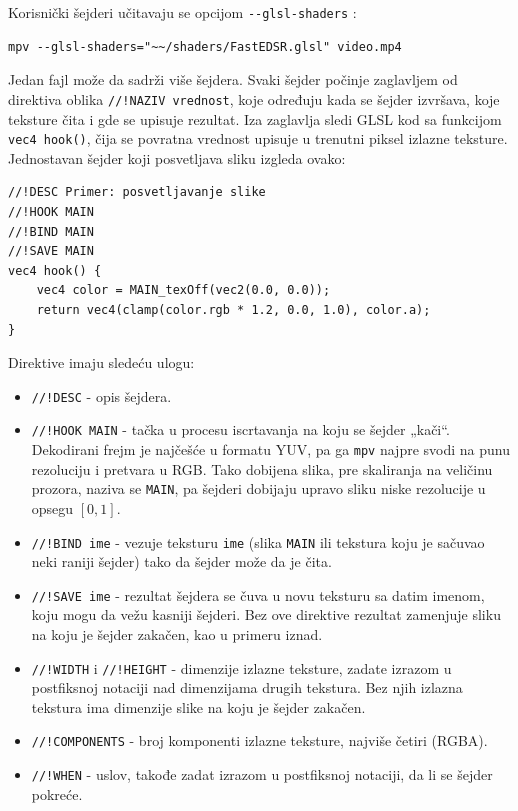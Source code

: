 \documentclass[12pt,a4paper]{article}
\begin{document}
Korisnički šejderi učitavaju se opcijom \texttt{-{}-glsl-shaders} \cite{mpvManual}:
\begin{verbatim}
mpv --glsl-shaders="~~/shaders/FastEDSR.glsl" video.mp4
\end{verbatim}

Jedan fajl može da sadrži više šejdera. Svaki šejder počinje zaglavljem od direktiva oblika \texttt{//!NAZIV vrednost}, koje određuju kada se šejder izvršava, koje teksture čita i gde se upisuje rezultat. Iza zaglavlja sledi GLSL kod sa funkcijom \texttt{vec4 hook()}, čija se povratna vrednost upisuje u trenutni piksel izlazne teksture. Jednostavan šejder koji posvetljava sliku izgleda ovako:

\begin{verbatim}
//!DESC Primer: posvetljavanje slike
//!HOOK MAIN
//!BIND MAIN
//!SAVE MAIN
vec4 hook() {
    vec4 color = MAIN_texOff(vec2(0.0, 0.0));
    return vec4(clamp(color.rgb * 1.2, 0.0, 1.0), color.a);
}
\end{verbatim}

Direktive imaju sledeću ulogu:
\begin{itemize}[itemsep=0pt, label=$\circ$]
	\item \texttt{//!DESC} - opis šejdera.
	\item \texttt{//!HOOK MAIN} - tačka u procesu iscrtavanja na koju se šejder „kači“. Dekodirani frejm je najčešće u formatu YUV, pa ga \texttt{mpv} najpre svodi na punu rezoluciju i pretvara u RGB. Tako dobijena slika, pre skaliranja na veličinu prozora, naziva se \texttt{MAIN}, pa šejderi dobijaju upravo sliku niske rezolucije u opsegu $[0,1]$.
	\item \texttt{//!BIND ime} - vezuje teksturu \texttt{ime} (slika \texttt{MAIN} ili tekstura koju je sačuvao neki raniji šejder) tako da šejder može da je čita.
	\item \texttt{//!SAVE ime} - rezultat šejdera se čuva u novu teksturu sa datim imenom, koju mogu da vežu kasniji šejderi. Bez ove direktive rezultat zamenjuje sliku na koju je šejder zakačen, kao u primeru iznad.
	\item \texttt{//!WIDTH} i \texttt{//!HEIGHT} - dimenzije izlazne teksture, zadate izrazom u postfiksnoj notaciji nad dimenzijama drugih tekstura. Bez njih izlazna tekstura ima dimenzije slike na koju je šejder zakačen.
	\item \texttt{//!COMPONENTS} - broj komponenti izlazne teksture, najviše četiri (RGBA).
	\item \texttt{//!WHEN} - uslov, takođe zadat izrazom u postfiksnoj notaciji, da li se šejder pokreće.
\end{itemize}
\end{document}
